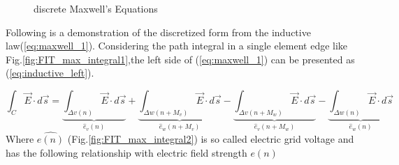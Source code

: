 \begin{figure}[!ht]
\centering
{}
\hfill
{}
\hfill
{}
\caption{discrete Maxwell's Equations}
\end{figure}

Following is a demonstration of the discretized form from the  inductive law(\ref{eq:maxwell_1}). Considering the path integral in a single element edge like Fig.\ref{fig:FIT_max_integral1},the left side of (\ref{eq:maxwell_1}) can be presented as (\ref{eq:inductive_left}). 

\begin{equation}
\int_{C}\vec{E}\cdot d\vec{s}
=\underbrace{\int_{\Delta v(n)}\vec{E}\cdot d\vec{s}}_{\widehat{e}_{v}(n)}
+\underbrace{\int_{\Delta w(n+M_{v})}\vec{E}\cdot d\vec{s}}_{\widehat{e}_{w}(n+M_{v})}
-\underbrace{\int_{\Delta v(n+M_{w})}\vec{E}\cdot d\vec{s}}_{\widehat{e}_{v}(n+M_{w})}
-\underbrace{\int_{\Delta w(n)}\vec{E}\cdot d\vec{s}}_{\widehat{e}_{w}(n)}
\label{eq:inductive_left}
\end{equation}
Where $\widehat{e(n)}$ (Fig.\ref{fig:FIT_max_integral2}) is so called  electric grid voltage and has the following relationship with electric field strength $e(n)$


